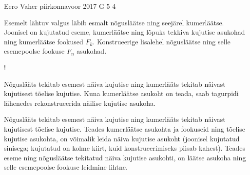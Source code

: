 {Eero Vaher} %
{piirkonnavoor} %
{2017} %
{G 5} %
{4} %
{
\ifStatement
Esemelt lähtuv valgus läbib esmalt nõgusläätse ning seejärel kumerläätse. Joonisel on kujutatud eseme, kumerläätse ning lõpuks tekkiva kujutise asukohad ning kumerläätse fookused $F_k$. Konstrueerige lisalehel nõgusläätse ning selle esemepoolse fookuse $F_n$ asukohad. 

\begin{resizebox}{\linewidth}{!}{
		}
\end{resizebox}
\fi


\ifHint
Nõguslääts tekitab esemest näiva kujutise ning kumerlääts tekitab näivast kujutisest tõelise kujutise. Kuna kumerläätse asukoht on teada, saab tagurpidi lähenedes rekonstrueerida näilise kujutise asukoha.
\fi


\ifSolution
Nõguslääts tekitab esemest näiva kujutise ning kumerlääts tekitab näivast kujutisest tõelise kujutise. Teades kumerläätse asukohta ja fookuseid ning tõelise kujutise asukohta, on võimalik leida näiva kujutise asukoht (joonisel kujutatud sinisega; kujutatud on kolme kiirt, kuid konstrueerimiseks piisab kahest). Teades eseme ning nõgusläätse tekitatud näiva kujutise asukohti, on läätse asukoha ning selle esemepoolse fookuse leidmine lihtne. 

}
